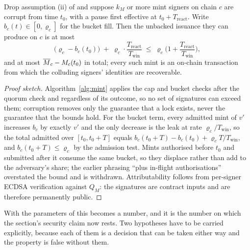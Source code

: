 \begin{proposition}
\label{prop:bounded-mint}
Drop assumption (ii) of  and suppose $k_M$ or more mint signers on chain
$c$ are corrupt from time $t_0$, with a pause first effective at $t_0 + T_{\mathrm{react}}$. Write
$b_c(t) \in [0, \varrho_c]$ for the bucket fill. Then the unbacked issuance they can produce on $c$
is at most
\[
\big(\varrho_c - b_c(t_0)\big) \;+\; \varrho_c \cdot \frac{T_{\mathrm{react}}}{T_{\mathrm{win}}}
\;\le\; \varrho_c\Big(1 + \frac{T_{\mathrm{react}}}{T_{\mathrm{win}}}\Big),
\]
and at most $\overline{M}_{c} - M_c(t_0)$ in total; every such mint is an on-chain transaction from which the
colluding signers' identities are recoverable. \planned
\end{proposition}

\begin{proof}[Proof sketch]
Algorithm~\ref{alg:mint} applies the cap and bucket checks after the quorum check and regardless of
its outcome, so no set of signatures can exceed them; corruption removes only the guarantee that a
lock exists, never the guarantee that the bounds hold. For the bucket term, every admitted mint of
$v'$ increases $b_c$ by exactly $v'$ and the only decrease is the leak at rate
$\varrho_c / T_{\mathrm{win}}$, so the total admitted over $[t_0, t_0 + T]$ equals
$b_c(t_0 + T) - b_c(t_0) + \varrho_c T / T_{\mathrm{win}}$, and $b_c(t_0+T) \le \varrho_c$ by the
admission test. Mints authorised before $t_0$ and submitted after it consume the same bucket, so they
displace rather than add to the adversary's share; the earlier phrasing ``plus in-flight
authorisations'' overstated the bound and is withdrawn. Attributability follows from per-signer
ECDSA verification against $Q_M$: the signatures are contract inputs and are therefore permanently
public.
\end{proof}

\noindent With the parameters of  this becomes a number, and it is the
number on which the section's security claim now rests. Two hypotheses have to be carried
explicitly, because each of them is a decision that can be taken either way and the property is
false without them.

